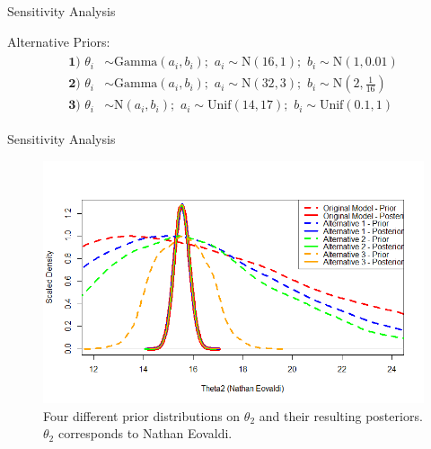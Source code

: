 \documentclass[xcolor=dvipsnames]{beamer}
\begin{document}
\begin{frame}{Sensitivity Analysis}

Alternative Priors:
\begin{align*}
    \begin{split}
        \textbf{1) } \theta_i &\sim \text{Gamma}(a_i, b_i); \hspace{4pt} a_i \sim \text{N}(16, 1); \hspace{4pt} b_i \sim \text{N}(1,0.01) \\
        \textbf{2) } \theta_i &\sim \text{Gamma}(a_i, b_i); \hspace{4pt} a_i \sim \text{N}(32, 3); \hspace{4pt} b_i \sim \text{N}(2,\frac{1}{16}) \\
        \textbf{3) } \theta_i &\sim \text{N}(a_i, b_i); \hspace{4pt} a_i \sim \text{Unif}(14,17); \hspace{4pt} b_i \sim \text{Unif}(0.1, 1) 
    \end{split}
\end{align*}

\end{frame}


\begin{frame}{Sensitivity Analysis}

\begin{figure}[h]
    \centering
    \includegraphics[scale=0.45]{figs/sensitivity.png}
    \caption{Four different prior distributions on $\theta_2$ and their resulting posteriors. $\theta_2$ corresponds to Nathan Eovaldi. }
    \label{fig:sens}
\end{figure}

\end{frame}
\end{document}
